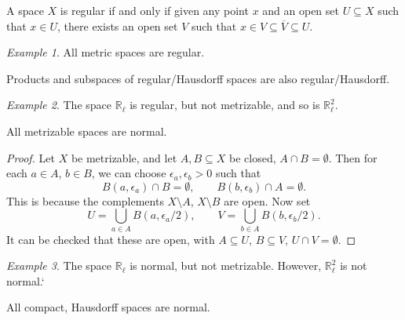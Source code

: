 \documentclass[11pt]{article}
\newcommand{\R}{\mathbb{R}}
\theoremstyle{definition}
\theoremstyle{remark}
\newtheorem*{example}{Example}
\numberwithin{equation}{section}
\begin{document}
    \begin{lemma}
        A space $X$ is regular if and only if given any point $x$ and an open set $U
        \subseteq X$ such that $x \in U$, there exists an open set $V$ such that $x
        \in V \subseteq \overline{V} \subseteq U$.
    \end{lemma}
    \begin{example}
        All metric spaces are regular.
    \end{example}

    \begin{lemma}
        Products and subspaces of regular/Hausdorff spaces are also
        regular/Hausdorff.
    \end{lemma}
    \begin{example}
        The space $\R_\ell$ is regular, but not metrizable, and so is $\R_\ell^2$.
    \end{example}

    \begin{lemma}
        All metrizable spaces are normal.
    \end{lemma}
    \begin{proof}
        Let $X$ be metrizable, and let $A, B \subseteq X$ be closed, $A \cap B =
        \emptyset$. Then for each $a \in A$, $b \in B$, we can choose $\epsilon_a,
        \epsilon_b > 0$ such that \[
            B(a, \epsilon_a) \cap B = \emptyset, \qquad
            B(b, \epsilon_b) \cap A = \emptyset.
        \] This is because the complements $X\setminus A$, $X\setminus B$ are open.
        Now set \[
            U = \bigcup_{a \in A} B(a, \epsilon_a / 2), \qquad
            V = \bigcup_{b \in A} B(b, \epsilon_b / 2).
        \] It can be checked that these are open, with $A \subseteq U$, $B \subseteq
        V$, $U \cap V = \emptyset$.
    \end{proof}
    
    \begin{example}
        The space $\R_\ell$ is normal, but not metrizable. However, $\R_\ell^2$ is
        not normal.`
    \end{example}

    \begin{theorem}
        All compact, Hausdorff spaces are normal.
    \end{theorem}
\end{document}
